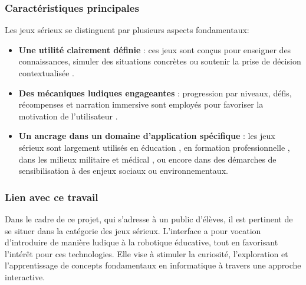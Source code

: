 \subsubsection{Caractéristiques principales}
Les jeux sérieux se distinguent par plusieurs aspects fondamentaux:

\begin{itemize}
    \item \textbf{Une utilité clairement définie} : ces jeux sont conçus pour enseigner des connaissances, simuler des situations concrètes ou soutenir la prise de décision contextualisée \autocite{david_r_michael_serious_2006}.
    
    \item \textbf{Des mécaniques ludiques engageantes} : progression par niveaux, défis, récompenses et narration immersive sont employés pour favoriser la motivation de l’utilisateur \autocite{ute_ritterfeld_serious_2009}.
    
    \item \textbf{Un ancrage dans un domaine d’application spécifique} : les jeux sérieux sont largement utilisés en éducation \autocite{breuer_why_2010}, en formation professionnelle \autocite{r_realite_2021}, dans les milieux militaire et médical \autocite{axinesis_axinesis_nodate}, ou encore dans des démarches de sensibilisation à des enjeux sociaux \autocite{devresse_hunteroiinside-out_2023} ou environnementaux.
\end{itemize}

\subsubsection{Lien avec ce travail}
Dans le cadre de ce projet, qui s’adresse à un public d’élèves, il est pertinent de se situer dans la catégorie des jeux sérieux.
L’interface a pour vocation d’introduire de manière ludique à la robotique éducative, tout en favorisant l’intérêt pour ces technologies. 
Elle vise à stimuler la curiosité, l’exploration et l’apprentissage de concepts fondamentaux en informatique à travers une approche interactive.
